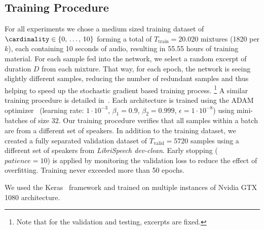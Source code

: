 \subsection{Training Procedure}%
\label{ssec:parameters}
For all experiments we chose a medium sized training dataset of \(\cardinality \in \textrm{\{0, \ldots, 10\}}\) forming a total of \(T_{\textrm{train}} = 20.020\) mixtures  (1820 per \(k\)), each containing 10 seconds of audio, resulting in 55.55 hours of training material.
For each sample fed into the network, we select a random excerpt of duration \(D\) from each mixture.
That way, for each epoch, the network is seeing slightly different samples, reducing the number of redundant samples and thus helping to speed up the stochastic gradient based training process.
\footnote{Note that for the validation and testing, excerpts are fixed.}
A similar training procedure is detailed in~\cite{schluter16, stoeter17}.
Each architecture is trained using the ADAM optimizer~\cite{kingma14} (learning rate: \(1 \cdot 10^{-3}\), \(\beta_1=0.9\), \(\beta_2=0.999\), \(\epsilon=1 \cdot 10^{-8}\)) using mini-batches of size 32.
Our training procedure verifies that all samples within a batch are from a different set of speakers.
In addition to the training dataset, we created a fully separated validation dataset of \(T_{\textrm{valid}} = 5720\) samples using a different set of speakers from \emph{LibriSpeech dev-clean}.
Early stopping (\(patience = 10\)) is applied by monitoring the validation loss to reduce the effect of overfitting.
Training never exceeded more than 50 epochs.
\par
We used the Keras~\cite{chollet2015keras} framework and trained on multiple instances of Nvidia GTX 1080 architecture.
